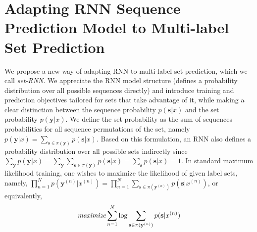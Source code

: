 

\section{Adapting RNN Sequence Prediction Model to Multi-label Set Prediction}
\label{sec:Model}

We propose a new way of adapting RNN to multi-label set prediction, which we call \emph{set-RNN}. We appreciate the RNN model structure (defines a probability distribution over all possible sequences directly) and introduce training and prediction objectives tailored for sets that take advantage of it, while making a clear distinction between the sequence probability $p(\mathbf{s}|x)$ and the set probability $p(\mathbf{y}|x)$. 
  We define the set probability as the sum of sequences probabilities for all sequence permutations of the set, namely $p(\mathbf{y}|x)=\sum_{\mathbf{s}\in \pi(\mathbf{y})} p(\mathbf{s}|x)$. Based on this formulation, an RNN also defines a probability distribution over all possible sets indirectly since $\sum_{\mathbf{y}} p(\mathbf{y}|x)=\sum_{\mathbf{y}}\sum_{\mathbf{s}\in \pi(\mathbf{y})} p(\mathbf{s}|x)=\sum_{\mathbf{s}} p(\mathbf{s}|x)=1$. In standard maximum likelihood training, one wishes to maximize the likelihood of given label sets, namely, $\prod_{n=1}^N p(\mathbf{y}^{(n)}|x^{(n)})=\prod_{n=1}^N \sum_{\mathbf{s}\in \pi(\mathbf{y}^{(n)})} p(\mathbf{s}|x^{(n)})$, or equivalently, 
\begin{align}
\textit{maximize} \sum_{n=1}^N \log \sum_{\mathbf{s}\in \pi(\mathbf{y}^{(n)})} p(\mathbf{s}|x^{(n)})
\label{eq:right_obj}
\end{align}

